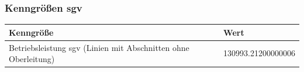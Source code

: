 \newpage
\subsubsection{Kenngrößen \acrlong{sgv}}
\begin{center}
	\begin{tabularx}{\textwidth}{l | X } Kenngröße & Wert \\
	\hline
	Betriebsleistung \acrshort{sgv} (Linien mit Abschnitten ohne Oberleitung) & \num{130993.21200000006}
	\end{tabularx}
\end{center}